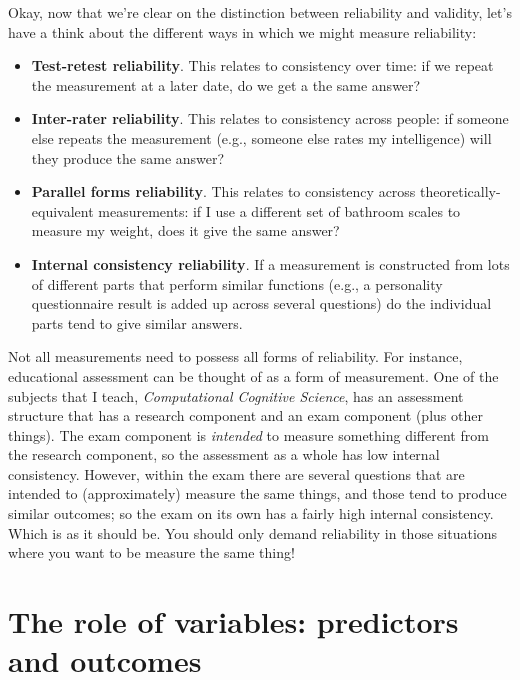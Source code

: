 \documentclass[
]{book}
\begin{document}
Okay, now that we're clear on the distinction between reliability and validity, let's have a think about the different ways in which we might measure reliability:

\begin{itemize}
\item
  \textbf{Test-retest reliability}. This relates to consistency over time: if we repeat the measurement at a later date, do we get a the same answer?
\item
  \textbf{Inter-rater reliability}. This relates to consistency across people: if someone else repeats the measurement (e.g., someone else rates my intelligence) will they produce the same answer?
\item
  \textbf{Parallel forms reliability}. This relates to consistency across theoretically-equivalent measurements: if I use a different set of bathroom scales to measure my weight, does it give the same answer?
\item
  \textbf{Internal consistency reliability}. If a measurement is constructed from lots of different parts that perform similar functions (e.g., a personality questionnaire result is added up across several questions) do the individual parts tend to give similar answers.
\end{itemize}

Not all measurements need to possess all forms of reliability. For instance, educational assessment can be thought of as a form of measurement. One of the subjects that I teach, {\emph{Computational Cognitive Science}}, has an assessment structure that has a research component and an exam component (plus other things). The exam component is {\emph{intended}} to measure something different from the research component, so the assessment as a whole has low internal consistency. However, within the exam there are several questions that are intended to (approximately) measure the same things, and those tend to produce similar outcomes; so the exam on its own has a fairly high internal consistency. Which is as it should be. You should only demand reliability in those situations where you want to be measure the same thing!

\hypertarget{the-role-of-variables-predictors-and-outcomes}{%
\section{The role of variables: predictors and outcomes}\label{the-role-of-variables-predictors-and-outcomes}}
\end{document}
